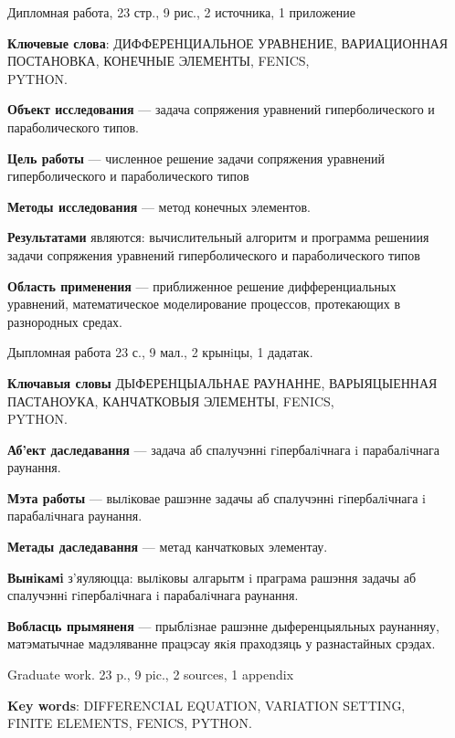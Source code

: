 \pagestyle{plain}
Дипломная работа, 23 стр., 9 рис., 2 источника, 1 приложение

\textbf{Ключевые слова}: ДИФФЕРЕНЦИАЛЬНОЕ УРАВНЕНИЕ, ВАРИАЦИОННАЯ ПОСТАНОВКА, 
КОНЕЧНЫЕ ЭЛЕМЕНТЫ, FENICS, \\ PYTHON.

\textbf{Объект исследования} --- задача сопряжения уравнений гиперболического и параболического типов.

\textbf{Цель работы} --- численное решение задачи сопряжения уравнений гиперболического и параболического типов

\textbf{Методы исследования} --- метод конечных элементов.

\textbf{Результатами} являются: вычислительный алгоритм и программа решениия задачи сопряжения
уравнений гиперболического и параболического типов

\textbf{Область применения} --- приближенное решение дифференциальных \\ уравнений, математическое
моделирование процессов, протекающих в разнородных средах.


Дыпломная работа 23 с., 9 мал., 2 крынiцы, 1 дадатак.

\textbf{Ключавыя словы} ДЫФЕРЕНЦЫАЛЬНАЕ РАУНАННЕ, ВАРЫЯЦЫЕННАЯ ПАСТАНОУКА, КАНЧАТКОВЫЯ ЭЛЕМЕНТЫ,
FENICS, \\ PYTHON.

\textbf{Аб'ект даследавання} --- задача аб спалучэннi гiпербалiчнага i парабалiчнага раунання.

\textbf{Мэта работы} --- вылiковае рашэнне задачы аб спалучэннi гiпербалiчнага i парабалiчнага раунання.

\textbf{Метады даследавання} --- метад канчатковых элементау.

\textbf{Вынiкамi} з'яуляюцца: вылiковы алгарытм i праграма рашэння задачы аб спалучэннi гiпербалiчнага i парабалiчнага раунання.

\textbf{Вобласць прымяненя} --- прыблiзнае рашэнне дыференцыяльных раунанняу, матэматычнае
мадэляванне працэсау якiя праходзяць у разнастайных срэдах. \\

\newpage


Graduate work. 23 p., 9 pic., 2 sources, 1 appendix

\textbf{Key words}: DIFFERENCIAL EQUATION, VARIATION SETTING,\\ FINITE ELEMENTS, FENICS, PYTHON.

